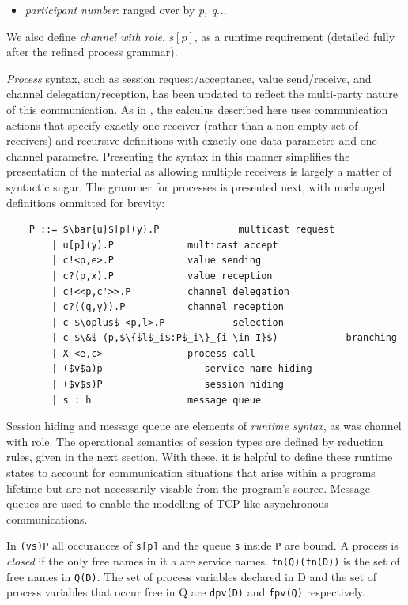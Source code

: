 \documentclass[11pt]{scrartcl}
\begin{document}
\begin{itemize}[noitemsep]
	\item[] \emph{participant number}: ranged over by \emph{p, q...}
\end{itemize}

We also define \emph{channel with role}, $s[p]$, as a runtime requirement
(detailed fully after the refined process grammar).

\emph{Process} syntax, such as session request/acceptance, value 
send/receive, and channel delegation/reception, has been updated to reflect
the multi-party nature of this communication. As in \cite{CCPY15}, the 
calculus described here uses communication actions that specify exactly
one receiver (rather than a non-empty set of receivers) and recursive
definitions with exactly one data parametre and one channel parametre. Presenting
the syntax in this manner simplifies the presentation of the material as
allowing multiple receivers is largely a matter of syntactic sugar. The grammer
for processes is presented next, with unchanged definitions ommitted for brevity:
\\

\begin{lstlisting}
    P ::= $\bar{u}$[p](y).P              multicast request
        | u[p](y).P             multicast accept
        | c!<p,e>.P             value sending
        | c?(p,x).P             value reception
        | c!<<p,c'>>.P          channel delegation
        | c?((q,y)).P           channel reception
        | c $\oplus$ <p,l>.P            selection
        | c $\&$ (p,$\{$l$_i$:P$_i\}_{i \in I}$)            branching
        | X <e,c>               process call
        | ($v$a)p                  service name hiding
        | ($v$s)P                  session hiding
        | s : h                 message queue
\end{lstlisting}

Session hiding and message queue are elements of \emph{runtime syntax}, 
as was channel with role. The operational semantics of session types are
defined by reduction rules, given in the next section. With these, it is
helpful to define these runtime states to account for communication situations
that arise within a programs lifetime but are not necessarily visable from
the program's source. Message queues are used to enable the modelling of
TCP-like asynchronous communications.

In \texttt{(vs)P} all occurances of \texttt{s[p]} and the queue \texttt{s}
inside \texttt{P} are bound. A process is \emph{closed} if the only free 
names in it a are service names. \texttt{fn(Q)(fn(D))} is the set of free 
names in \texttt{Q(D)}. The set of process variables declared in D and the 
set of process variables that occur free in Q are \texttt{dpv(D)} and 
\texttt{fpv(Q)} respectively.
\end{document}
